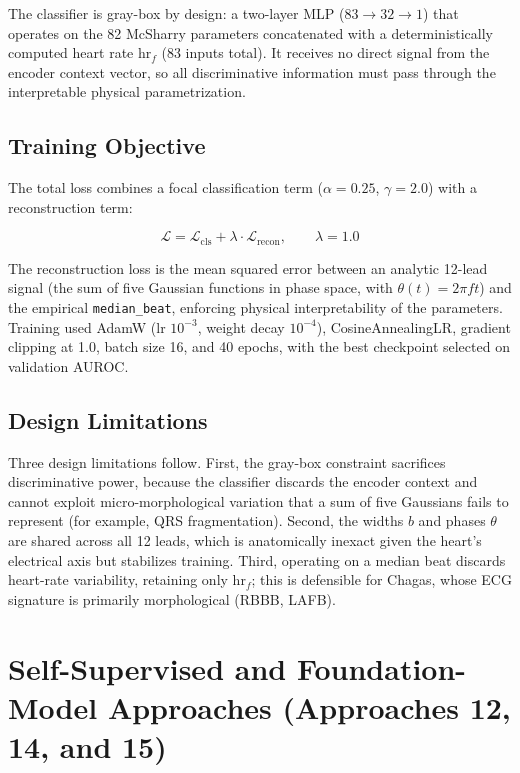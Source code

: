 The classifier is gray-box by design: a two-layer MLP ($83 \to 32 \to 1$) that operates on the 82 McSharry parameters concatenated with a deterministically computed heart rate $\text{hr}_f$ (83 inputs total). It receives no direct signal from the encoder context vector, so all discriminative information must pass through the interpretable physical parametrization.

\subsection{Training Objective}

The total loss combines a focal classification term ($\alpha = 0.25$, $\gamma = 2.0$) with a reconstruction term:

\begin{equation}
    \mathcal{L} = \mathcal{L}_{\text{cls}} + \lambda \cdot \mathcal{L}_{\text{recon}}, \qquad \lambda = 1.0
\end{equation}

The reconstruction loss is the mean squared error between an analytic 12-lead signal (the sum of five Gaussian functions in phase space, with $\theta(t) = 2\pi f t$) and the empirical \texttt{median\_beat}, enforcing physical interpretability of the parameters. Training used AdamW (lr $10^{-3}$, weight decay $10^{-4}$), CosineAnnealingLR, gradient clipping at 1.0, batch size 16, and 40 epochs, with the best checkpoint selected on validation AUROC.

\subsection{Design Limitations}

Three design limitations follow. First, the gray-box constraint sacrifices discriminative power, because the classifier discards the encoder context and cannot exploit micro-morphological variation that a sum of five Gaussians fails to represent (for example, QRS fragmentation). Second, the widths $b$ and phases $\theta$ are shared across all 12 leads, which is anatomically inexact given the heart's electrical axis but stabilizes training. Third, operating on a median beat discards heart-rate variability, retaining only $\text{hr}_f$; this is defensible for Chagas, whose ECG signature is primarily morphological (RBBB, LAFB).


\section{Self-Supervised and Foundation-Model Approaches (Approaches 12, 14, and 15)}
\label{sec:foundation}

